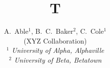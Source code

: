 \documentclass[preprint,11pt]{elsarticle}

\begin{frontmatter}
\title{T}
\author{
\begin{small}
A.~Able$^{1}$, B.~C.~Baker$^{2}$, C.~Cole$^{1}$
\\
\vspace{0.2cm}
(XYZ Collaboration)\\
\vspace{0.2cm} {\it
$^{1}$ University of Alpha, Alphaville\\
$^{2}$ University of Beta, Betatown\\
\vspace{7cm}
}
\end{small}
}
\begin{abstract}
Text.
\end{abstract}
\end{frontmatter}

